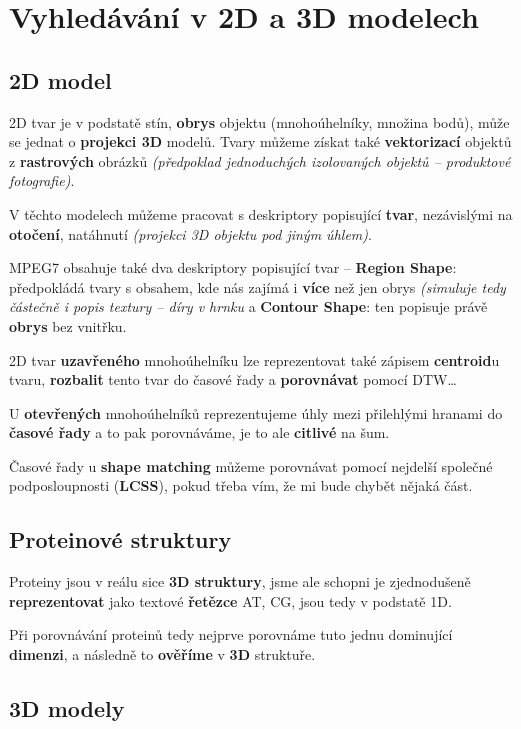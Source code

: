 \section{Vyhledávání v 2D a 3D modelech}

\subsection{2D model}

2D tvar je v podstatě stín, \textbf{obrys} objektu (mnohoúhelníky, množina bodů), může se jednat o \textbf{projekci 3D} modelů. Tvary můžeme získat také \textbf{vektorizací} objektů z \textbf{rastrových} obrázků \textit{(předpoklad jednoduchých izolovaných objektů -- produktové fotografie)}.

V těchto modelech můžeme pracovat s deskriptory popisující \textbf{tvar}, nezávislými na \textbf{otočení}, natáhnutí \textit{(projekci 3D objektu pod jiným úhlem)}.

MPEG7 obsahuje také dva deskriptory popisující tvar -- \textbf{Region Shape}: předpokládá tvary s obsahem, kde nás zajímá i \textbf{více} než jen obrys \textit{(simuluje tedy částečně i popis textury -- díry v hrnku} a \textbf{Contour Shape}: ten popisuje právě \textbf{obrys} bez vnitřku.

2D tvar \textbf{uzavřeného} mnohoúhelníku lze reprezentovat také zápisem \textbf{centroid}u tvaru, \textbf{rozbalit} tento tvar do časové řady a \textbf{porovnávat} pomocí DTW\ldots

U \textbf{otevřených} mnohoúhelníků reprezentujeme úhly mezi přilehlými hra\-nami do \textbf{časové řady} a to pak porovnáváme, je to ale \textbf{citlivé} na šum.

Časové řady u \textbf{shape matching} můžeme porovnávat pomocí nejdelší společ\-né podposloupnosti (\textbf{LCSS}), pokud třeba vím, že mi bude chybět nějaká část.

\subsection{Proteinové struktury}

Proteiny jsou v reálu sice \textbf{3D struktury}, jsme ale schopni je zjednodušeně \textbf{reprezentovat} jako textové \textbf{řetězce} AT, CG, jsou tedy v podstatě 1D.

Při porovnávání proteinů tedy nejprve porovnáme tuto jednu dominující \textbf{dimenzi}, a následně to \textbf{ověříme} v \textbf{3D} struktuře.

\subsection{3D modely}

